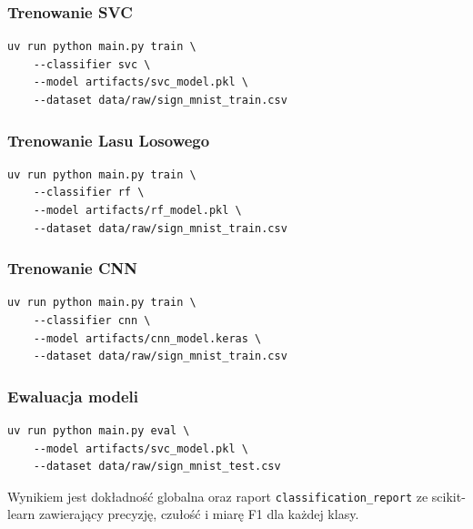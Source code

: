 \subsubsection{Trenowanie SVC}

\begin{lstlisting}[style=styleBash, caption={Polecenie trenowania klasyfikatora SVC}, label=lst:train-svc]
uv run python main.py train \
    --classifier svc \
    --model artifacts/svc_model.pkl \
    --dataset data/raw/sign_mnist_train.csv
\end{lstlisting}

\subsubsection{Trenowanie Lasu Losowego}

\begin{lstlisting}[style=styleBash, caption={Polecenie trenowania Lasu Losowego}, label=lst:train-rf]
uv run python main.py train \
    --classifier rf \
    --model artifacts/rf_model.pkl \
    --dataset data/raw/sign_mnist_train.csv
\end{lstlisting}

\subsubsection{Trenowanie CNN}

\begin{lstlisting}[style=styleBash, caption={Polecenie trenowania CNN}, label=lst:train-cnn]
uv run python main.py train \
    --classifier cnn \
    --model artifacts/cnn_model.keras \
    --dataset data/raw/sign_mnist_train.csv
\end{lstlisting}

\subsubsection{Ewaluacja modeli}

\begin{lstlisting}[style=styleBash, caption={Ewaluacja modelu SVC na zbiorze testowym}, label=lst:eval]
uv run python main.py eval \
    --model artifacts/svc_model.pkl \
    --dataset data/raw/sign_mnist_test.csv
\end{lstlisting}

Wynikiem jest dokładność globalna oraz raport \texttt{classification\_report}
ze scikit-learn zawierający precyzję, czułość i miarę F1 dla każdej klasy.

